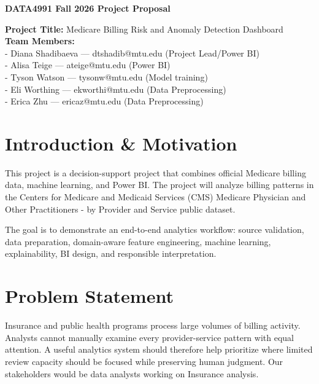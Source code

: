 \documentclass[12pt]{article}
\begin{document}
\begin{center}
    \Large \textbf{DATA4991 Fall 2026 Project Proposal} \\
\end{center}
\noindent
\textbf{Project Title:} 
Medicare Billing Risk and Anomaly Detection Dashboard \\
\noindent
\textbf{Team Members:} \\
- Diana Shadibaeva --- dtshadib@mtu.edu (Project Lead/Power BI)\\
- Alisa Teige --- ateige@mtu.edu (Power BI)\\
- Tyson Watson --- tysonw@mtu.edu (Model training)\\
- Eli Worthing --- ekworthi@mtu.edu (Data Preprocessing)  \\
- Erica Zhu --- ericaz@mtu.edu (Data Preprocessing)
\section{Introduction \& Motivation}
This project is a decision-support project that combines official Medicare billing data, machine learning, and Power BI. The project will analyze billing patterns in the Centers for Medicare and Medicaid Services (CMS) Medicare Physician and Other Practitioners - by Provider and Service public dataset. 

The goal is to demonstrate an end-to-end analytics workflow: source validation, data preparation, domain-aware feature engineering, machine learning, explainability, BI design, and responsible interpretation. 



\section{Problem Statement}

Insurance and public health programs process large volumes of billing activity. Analysts cannot manually examine every provider-service pattern with equal attention. A useful analytics system should therefore help prioritize where limited review capacity should be focused while preserving human judgment. Our stakeholders would be data analysts working on Insurance analysis.
\end{document}
